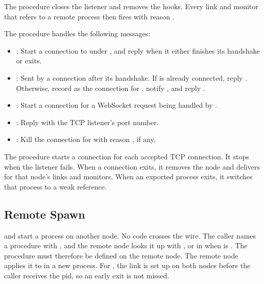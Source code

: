  The  procedure closes
the listener and removes the hooks. Every link and monitor that refers
to a remote process then fires with reason .

 The  procedure
handles the following messages:\antipar

\begin{itemize}
\item {}: Start a connection to
   under , and reply when it either
  finishes its handshake or exits.
\item {}: Sent by a
  connection after its handshake. If  is already connected,
  reply . Otherwise, record  as the connection
  for , notify , and reply
  .
\item {}: Start a connection for a
  WebSocket request being handled by .
\item {}: Reply with the TCP listener's port number.
\item {}: Kill the connection for
   with reason , if any.
\end{itemize}

 The  procedure
starts a connection for each accepted TCP connection. It stops when the
listener fails. When a connection exits, it removes the node and
delivers  for that node's links and monitors. When
an exported process exits, it switches that process to a weak
reference.

\subsection {Remote Spawn}\label{sec:dist-remote-spawn}

 and  start a process on
another node. No code crosses the wire. The caller names a procedure
with , and the remote node
looks it up with , or in  when
 is . The procedure must therefore be defined on
the remote node. The remote node applies it to  in a new
process. For , the link is set up on both nodes
before the caller receives the pid, so an early exit is not missed.

